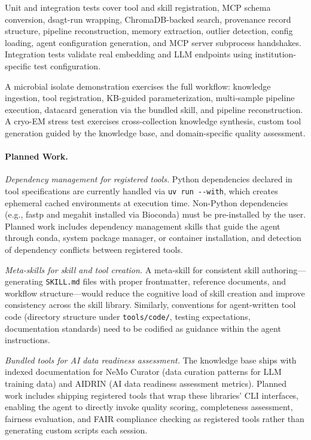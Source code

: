 \documentclass[11pt]{article}
\begin{document}
Unit and integration tests cover tool and skill registration,
MCP schema conversion, dsagt-run wrapping, ChromaDB-backed
search, provenance record structure, pipeline reconstruction,
memory extraction, outlier detection, config loading, agent
configuration generation, and MCP server subprocess
handshakes.
Integration tests validate real embedding and LLM endpoints
using institution-specific test configuration.

A microbial isolate demonstration exercises the full workflow:
knowledge ingestion, tool registration, KB-guided
parameterization, multi-sample pipeline execution, datacard
generation via the bundled skill, and pipeline reconstruction.
A cryo-EM stress test exercises cross-collection knowledge
synthesis, custom tool generation guided by the knowledge
base, and domain-specific quality assessment.

\paragraph{Planned Work.}

\emph{Dependency management for registered tools.}
Python dependencies declared in tool specifications are
currently handled via \texttt{uv run -{}-with}, which creates
ephemeral cached environments at execution time.
Non-Python dependencies (e.g., fastp and megahit installed via
Bioconda) must be pre-installed by the user.
Planned work includes dependency management skills that guide
the agent through conda, system package manager, or container
installation, and detection of dependency conflicts between
registered tools.

\emph{Meta-skills for skill and tool creation.}
A meta-skill for consistent skill authoring---generating
\texttt{SKILL.md} files with proper frontmatter, reference
documents, and workflow structure---would reduce the cognitive
load of skill creation and improve consistency across the
skill library.
Similarly, conventions for agent-written tool code
(directory structure under \texttt{tools/code/}, testing
expectations, documentation standards) need to be codified
as guidance within the agent instructions.

\emph{Bundled tools for AI data readiness assessment.}
The knowledge base ships with indexed documentation for NeMo
Curator (data curation patterns for LLM training data) and
AIDRIN (AI data readiness assessment metrics).
Planned work includes shipping registered tools that wrap
these libraries' CLI interfaces, enabling the agent to
directly invoke quality scoring, completeness assessment,
fairness evaluation, and FAIR compliance checking as
registered tools rather than generating custom scripts each
session.
\end{document}
